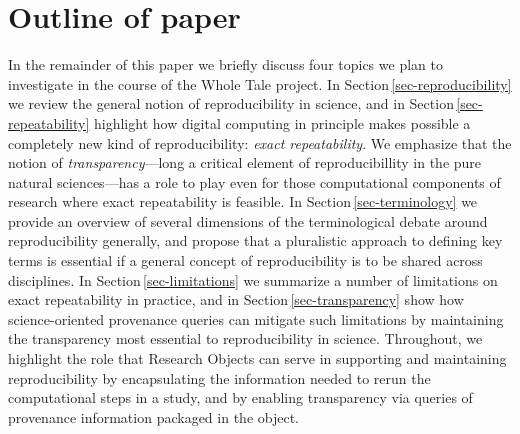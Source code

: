 \section{Outline of paper}
In the remainder of this paper 
we briefly discuss four topics we plan to investigate
	in the course of the Whole Tale project.
In Section\,\ref{sec-reproducibility} we review the general notion of
reproducibility in science, and in Section\,\ref{sec-repeatability} 
	highlight how digital computing in principle makes possible a completely new kind of reproducibility: 
	\emph{exact repeatability}. 
We emphasize that the notion of \emph{transparency}---long a critical element of
	reproducibillity in the pure natural sciences---has a role to play even for those computational components
	of research where exact repeatability is feasible.
In Section\,\ref{sec-terminology} we provide an overview of several dimensions of the terminological debate around reproducibility
	generally, and propose that a pluralistic approach to defining key terms is essential if a general 
	concept of reproducibility is to be shared across disciplines.
In Section\,\ref{sec-limitations} we summarize a number of limitations on exact repeatability in practice, and in Section\,\ref{sec-transparency}
	show how science-oriented provenance queries can mitigate such limitations by maintaining
 	the transparency most essential to reproducibility in science.
Throughout, we highlight the role that Research Objects
\cite{bechhofer2013whya} can serve in supporting and maintaining 
	reproducibility by encapsulating the information needed to rerun the computational steps
	in a study, and by enabling transparency via queries of provenance information
	packaged in the object. 
 

